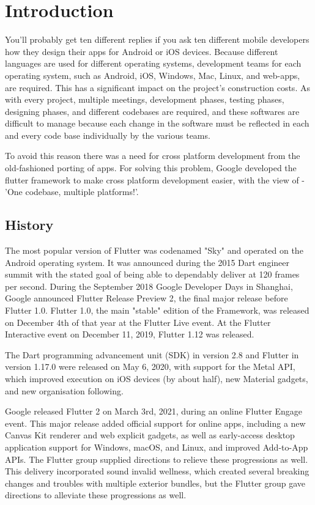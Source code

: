 \chapter{Introduction}

You'll probably get ten different replies if you ask ten different mobile developers how they design their apps for Android or iOS devices. Because different languages are used for different operating systems, development teams for each operating system, such as Android, iOS, Windows, Mac, Linux, and web-apps, are required. This has a significant impact on the project's construction costs. As with every project, multiple meetings, development phases, testing phases, designing phases, and different codebases are required, and these softwares are difficult to manage because each change in the software must be reflected in each and every code base individually by the various teams.

To avoid this reason there was a need for cross platform development from the old-fashioned porting of apps. For solving this problem, Google developed the flutter framework to make cross platform development easier, with the view of - ’One codebase, multiple platforms!’. 


\section{History}

The most popular version of Flutter was codenamed "Sky" and operated on the Android operating system. It was announced during the 2015 Dart engineer summit with the stated goal of being able to dependably deliver at 120 frames per second. During the September 2018 Google Developer Days in Shanghai, Google announced Flutter Release Preview 2, the final major release before Flutter 1.0. Flutter 1.0, the main "stable" edition of the Framework, was released on December 4th of that year at the Flutter Live event. At the Flutter Interactive event on December 11, 2019, Flutter 1.12 was released.

The Dart programming advancement unit (SDK) in version 2.8 and Flutter in version 1.17.0 were released on May 6, 2020, with support for the Metal API, which improved execution on iOS devices (by about half), new Material gadgets, and new organisation following.

Google released Flutter 2 on March 3rd, 2021, during an online Flutter Engage event. This major release added official support for online apps, including a new Canvas Kit renderer and web explicit gadgets, as well as early-access desktop application support for Windows, macOS, and Linux, and improved Add-to-App APIs. The Flutter group supplied directions to relieve these progressions as well. This delivery incorporated sound invalid wellness, which created several breaking changes and troubles with multiple exterior bundles, but the Flutter group gave directions to alleviate these progressions as well.

